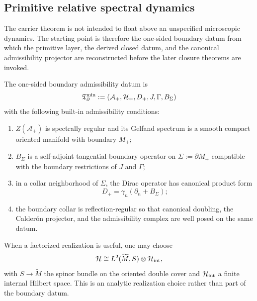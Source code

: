 \subsection{Primitive relative spectral dynamics}

The carrier theorem is not intended to float above an unspecified microscopic dynamics. The
starting point is therefore the one-sided boundary datum from which the primitive layer, the
derived closed datum, and the canonical admissibility projector are reconstructed before the later
closure theorems are invoked.

\begin{definition}
\label{def:reduced-theorem-datum}
The one-sided boundary admissibility datum is
\[
\mathfrak T_{\partial}^{\min}:=(\mathcal A_+,\mathcal H_+,D_+,J,\Gamma,B_\Sigma)
\]
with the following built-in admissibility conditions:
\begin{enumerate}[label=(\roman*), leftmargin=1.5em, topsep=3pt, itemsep=2pt]
    \item $Z(\mathcal A_+)$ is spectrally regular and its Gelfand spectrum is a smooth compact oriented manifold with boundary $M_+$;
    \item $B_\Sigma$ is a self-adjoint tangential boundary operator on $\Sigma:=\partial M_+$ compatible with the boundary restrictions of $J$ and $\Gamma$;
    \item in a collar neighborhood of $\Sigma$, the Dirac operator has canonical product form
    \[
    D_+=\gamma_n(\partial_n+B_\Sigma);
    \]
    \item the boundary collar is reflection-regular so that canonical doubling, the Calder\'on projector, and the admissibility complex are well posed on the same datum.
\end{enumerate}
\end{definition}

\begin{remark}
\label{ass:almost-commutative-factorization}
When a factorized realization is useful, one may choose
\[
\mathcal H\cong L^2(\widetilde M,S)\otimes \mathcal H_{\mathrm{int}},
\]
with $S\to\widetilde M$ the spinor bundle on the oriented double cover and $\mathcal H_{\mathrm{int}}$ a finite
internal Hilbert space. This is an analytic realization choice rather than part of the boundary
datum.
\end{remark}

